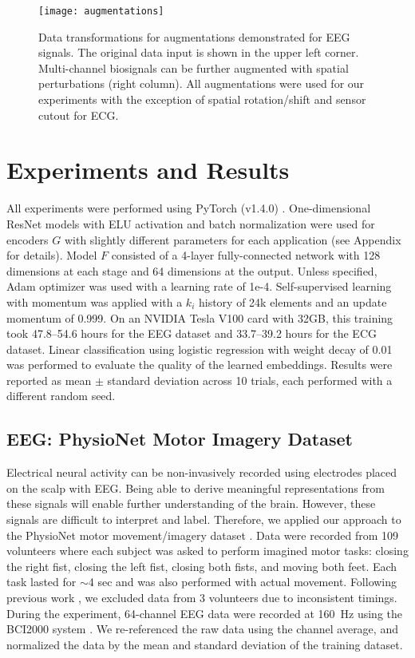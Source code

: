 \documentclass{article}
\begin{document}
\begin{figure}
  \centering
  \texttt{[image: augmentations]}
  \caption{Data transformations for augmentations demonstrated for EEG signals.
  The original data input is shown in the upper left corner. Multi-channel
  biosignals can be further augmented with spatial perturbations (right column).
  All augmentations were used for our experiments with the exception of spatial
  rotation/shift and sensor cutout for ECG.}
  \label{fig:augmentation}
\end{figure}

 \section{Experiments and Results}

All experiments were performed using PyTorch (v1.4.0) \cite{NIPS2019_9015}.
One-dimensional ResNet models \cite{he_identity_2016} with ELU activation and
batch normalization \cite{ioffe_batch_2015} were used for encoders $G$ with
slightly different parameters for each application (see Appendix for details).
Model $F$ consisted of a 4-layer fully-connected network with 128 dimensions at
each stage and 64 dimensions at the output. Unless specified, Adam optimizer
\cite{kingma_adam_2017} was used with a learning rate of 1e-4. Self-supervised
learning with momentum was applied with a $k_i$ history of 24k elements and an
update momentum of 0.999. On an NVIDIA Tesla V100 card with 32GB, this training
took 47.8--54.6 hours for the EEG dataset and 33.7--39.2 hours for the ECG
dataset. Linear classification using logistic regression with weight decay of
0.01 was performed to evaluate the quality of the learned embeddings. Results
were reported as mean $\pm$ standard deviation across 10 trials, each performed
with a different random seed.

\subsection{EEG: PhysioNet Motor Imagery Dataset}

Electrical neural activity can be non-invasively recorded using electrodes
placed on the scalp with EEG. Being able to derive meaningful representations
from these signals will enable further understanding of the brain. However,
these signals are difficult to interpret and label. Therefore, we applied our
approach to the PhysioNet motor movement/imagery dataset
\cite{goldberger_physiobank_2000,schalk_bci2000_2004,physionet_eeg_url}. Data
were recorded from 109 volunteers where each subject was asked to perform
imagined motor tasks: closing the right fist, closing the left fist, closing
both fists, and moving both feet. Each task lasted for $\sim$4 sec and was also
performed with actual movement. Following previous work \cite{kim_motor_2016},
we excluded data from 3 volunteers due to inconsistent timings. During the
experiment, 64-channel EEG data were recorded at 160~Hz using the BCI2000 system
\cite{schalk_bci2000_2004}. We re-referenced the raw data using the channel
average, and normalized the data by the mean and standard deviation of the
training dataset.
\end{document}

